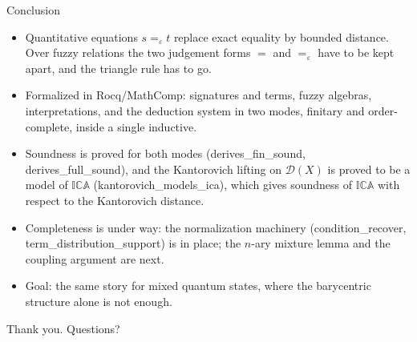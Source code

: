 \documentclass[10pt,aspectratio=169]{beamer}
\newcommand{\qeq}[1]{=_{#1}}
\newcommand{\ICA}{\mathbb{I}\mathbb{C}\mathbb{A}}
\newcommand{\Dist}{\mathcal{D}}
\newcommand{\eps}{\varepsilon}
\newcommand{\rid}[1]{{\ttfamily\small #1}}
\begin{document}
                \begin{frame}{Conclusion}
                    \begin{itemize}
                        \item[--] Quantitative equations $s
                            \qeq{\eps} t$ replace exact
                            equality by bounded distance. Over
                            fuzzy relations the two
                            judgement forms $=$ and $\qeq{\eps}$
                            have to be kept apart, and
                            the triangle rule has to go.
                            \medskip
                        \item[--] Formalized in Rocq/MathComp:
                            signatures and terms, fuzzy
                            algebras, interpretations, and the
                            deduction system in two modes,
                            finitary and order-complete, inside a
                            single inductive.
                            \medskip
                        \item[--] Soundness is proved for both modes
                            (\rid{derives\_fin\_sound},
                            \rid{derives\_full\_sound}), and the
                            Kantorovich lifting on $\Dist(X)$ is
                            proved to be a model of
                            $\ICA$
                            (\rid{kantorovich\_models\_ica}),
                            which gives soundness of
                            $\ICA$ with respect to the Kantorovich distance.
                            \medskip
                        \item[--] Completeness is under way: the
                            normalization machinery
                            (\rid{condition\_recover},
                            \rid{term\_distribution\_support}) is
                            in place; the $n$-ary mixture lemma and
                            the coupling argument are next.
                            \medskip
                        \item[--] Goal: the same story for mixed
                            quantum states, where the
                            barycentric structure alone is not enough.
                    \end{itemize}
                    \vfill
                    \begin{center}\large Thank you. Questions?
                    \end{center}
                \end{frame}
\end{document}
